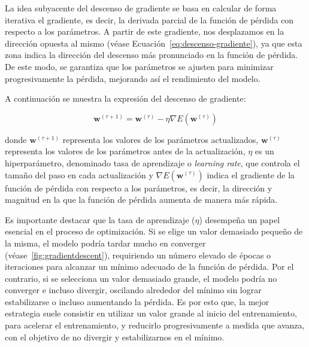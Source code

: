 La idea subyacente del descenso de gradiente se basa en calcular de forma iterativa el gradiente, es decir, la derivada parcial de la función de pérdida con respecto a los parámetros. A partir de este gradiente, nos desplazamos en la dirección opuesta al mismo (véase Ecuación~\eqref{eq:descenso-gradiente}), ya que esta zona indica la dirección del descenso más pronunciado en la función de pérdida. De este modo, se garantiza que los parámetros se ajusten para minimizar progresivamente la pérdida, mejorando así el rendimiento del modelo.\newline

A continuación se muestra la expresión del descenso de gradiente:

\begin{equation}
    \mathbf{w}^{(\tau + 1)} = \mathbf{w}^{(\tau)} - \eta \nabla E(\mathbf{w}^{(\tau)})
    \label{eq:descenso-gradiente}
\end{equation}

donde $\mathbf{w}^{(\tau + 1)}$ representa los valores de los parámetros actualizados, $\mathbf{w}^{(\tau)}$ representa los valores de los parámetros antes de la actualización, $\eta$ es un hiperparámetro, denominado tasa de aprendizaje o \emph{learning rate}, que controla el tamaño del paso en cada actualización y $\nabla E(\mathbf{w}^{(\tau)})$ indica el gradiente de la función de pérdida con respecto a los parámetros, es decir, la dirección y magnitud en la que la función de pérdida aumenta de manera más rápida.\newline

Es importante destacar que la tasa de aprendizaje ($\eta$) desempeña un papel esencial en el proceso de optimización. Si se elige un valor demasiado pequeño de la misma, el modelo podría tardar mucho en converger (véase~\autoref{fig:gradientdescent}), requiriendo un número elevado de épocas o iteraciones para alcanzar un mínimo adecuado de la función de pérdida. Por el contrario, si se selecciona un valor demasiado grande, el modelo podría no converger e incluso divergir, oscilando alrededor del mínimo sin lograr estabilizarse o incluso aumentando la pérdida. Es por esto que, la mejor estrategia suele consistir en utilizar un valor grande al inicio del entrenamiento, para acelerar el entrenamiento, y reducirlo progresivamente a medida que avanza, con el objetivo de no divergir y estabilizarnos en el mínimo.\newline

